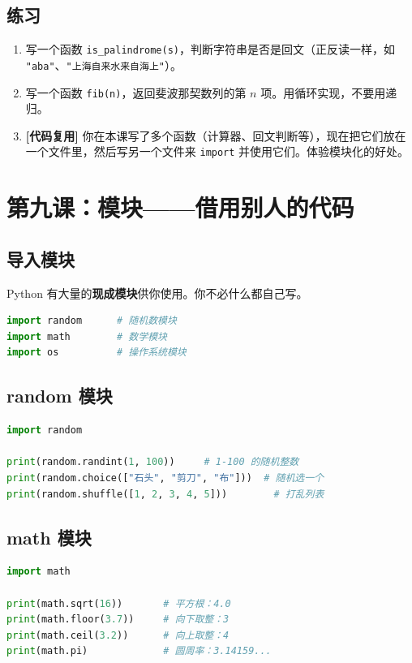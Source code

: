 \documentclass[a4paper,12pt]{ctexart}
\begin{document}
\subsection*{练习}

\begin{enumerate}
  \item 写一个函数 \texttt{is\_palindrome(s)}，判断字符串是否是回文（正反读一样，如 \texttt{"aba"}、\texttt{"上海自来水来自海上"}）。
  \item 写一个函数 \texttt{fib(n)}，返回斐波那契数列的第 $n$ 项。用循环实现，不要用递归。
  \item \textbf{[代码复用]} 你在本课写了多个函数（计算器、回文判断等），现在把它们放在一个文件里，然后写另一个文件来 \texttt{import} 并使用它们。体验模块化的好处。
\end{enumerate}

\section*{第九课：模块——借用别人的代码}

\subsection*{导入模块}

Python 有大量的\textbf{现成模块}供你使用。你不必什么都自己写。

\begin{lstlisting}[language=Python]
import random      # 随机数模块
import math        # 数学模块
import os          # 操作系统模块
\end{lstlisting}

\subsection*{random 模块}

\begin{lstlisting}[language=Python]
import random

print(random.randint(1, 100))     # 1-100 的随机整数
print(random.choice(["石头", "剪刀", "布"]))  # 随机选一个
print(random.shuffle([1, 2, 3, 4, 5]))        # 打乱列表
\end{lstlisting}

\subsection*{math 模块}

\begin{lstlisting}[language=Python]
import math

print(math.sqrt(16))       # 平方根：4.0
print(math.floor(3.7))     # 向下取整：3
print(math.ceil(3.2))      # 向上取整：4
print(math.pi)             # 圆周率：3.14159...
\end{lstlisting}
\end{document}
